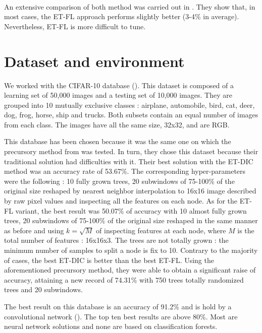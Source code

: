 \documentclass[a4paper]{report}
\begin{document}
		\paragraph{}
		An extensive comparison of both method was carried out in \cite{}. They show that, in most cases, the ET-FL approach performs slightly better (3-4\% in average). Nevertheless, ET-FL is more difficult to tune. 
			
	\section{Dataset and environment}
	We worked with the CIFAR-10 database (\cite{cifar}). This dataset is composed of a learning set of 50,000 images and a testing set of 10,000 images. They are grouped into 10 mutually exclusive classes : airplane, automobile, bird, cat, deer, dog, frog, horse, ship and trucks. Both subsets contain an equal number of images from each class. The images have all the same size, 32x32, and are RGB.
	\par
	This database has been chosen because it was the same one on which the precursory method from \cite{} was tested. In turn, they chose this dataset because their traditional solution had difficulties with it. Their best solution with the ET-DIC method was an accuracy rate of 53.67\%. The corresponding hyper-parameters were the following : 10 fully grown trees, 20 subwindows of 75-100\% of the original size reshaped by nearest neighbor interpolation to 16x16 image described by raw pixel values and inspecting all the features on each node. As for the ET-FL variant, the best result was 50.07\% of accuracy with 10 almost fully grown trees, 20 subwindows of 75-100\% of the original size reshaped in the same manner as before and using $k = \sqrt{M}$ of inspecting features at each node, where $M$ is the total number of features : 16x16x3. The trees are not totally grown : the minimum number of samples to split a node is fix to 10. Contrary to the majority of cases, the best ET-DIC is better than the best ET-FL.
	Using the aforementioned precursory method, they were able to obtain a significant raise of accuracy, attaining a new record of 74.31\% with 750 trees totally randomized trees and 20 subwindows.
	\par
	The best result on this database is an accuracy of 91.2\% and is hold by a convolutional network (\cite{bestcifar}). The top ten best results are above 80\%. Most are neural network solutions and none are based on classification forests.
\end{document}

